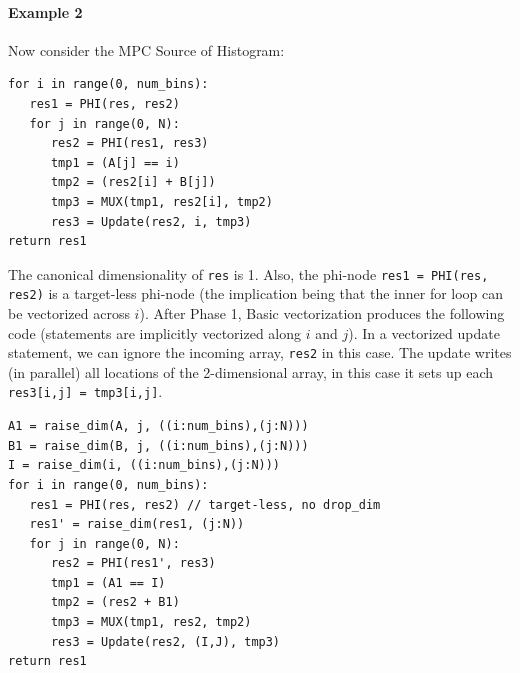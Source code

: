 \documentclass[sigconf, screen, natbib=false, dvipsnames, table]{acmart}
\theoremstyle{definition}
\begin{document}

\paragraph{Example 2} Now consider the MPC Source of Histogram:

{\small
\begin{verbatim}
for i in range(0, num_bins):
   res1 = PHI(res, res2)
   for j in range(0, N):
      res2 = PHI(res1, res3)
      tmp1 = (A[j] == i)
      tmp2 = (res2[i] + B[j])
      tmp3 = MUX(tmp1, res2[i], tmp2)
      res3 = Update(res2, i, tmp3)     
return res1
\end{verbatim}
}

The canonical dimensionality of \texttt{res} is 1. Also, the phi-node \texttt{res1 = PHI(res, res2)} is a target-less phi-node (the implication being that the inner for loop can be vectorized across $i$). After Phase 1, Basic vectorization produces the following code (statements are implicitly vectorized along $i$ and $j$). In a vectorized update statement, we can ignore the incoming array, \texttt{res2} in this case. The update writes (in parallel) all locations of the 2-dimensional array, in this case it sets up each \texttt{res3[i,j] = tmp3[i,j]}.

{\small
\begin{verbatim}
A1 = raise_dim(A, j, ((i:num_bins),(j:N)))
B1 = raise_dim(B, j, ((i:num_bins),(j:N)))
I = raise_dim(i, ((i:num_bins),(j:N)))
for i in range(0, num_bins):
   res1 = PHI(res, res2) // target-less, no drop_dim
   res1' = raise_dim(res1, (j:N))
   for j in range(0, N):
      res2 = PHI(res1', res3)
      tmp1 = (A1 == I)
      tmp2 = (res2 + B1)
      tmp3 = MUX(tmp1, res2, tmp2)
      res3 = Update(res2, (I,J), tmp3) 
return res1
\end{verbatim}
}
\end{document}
